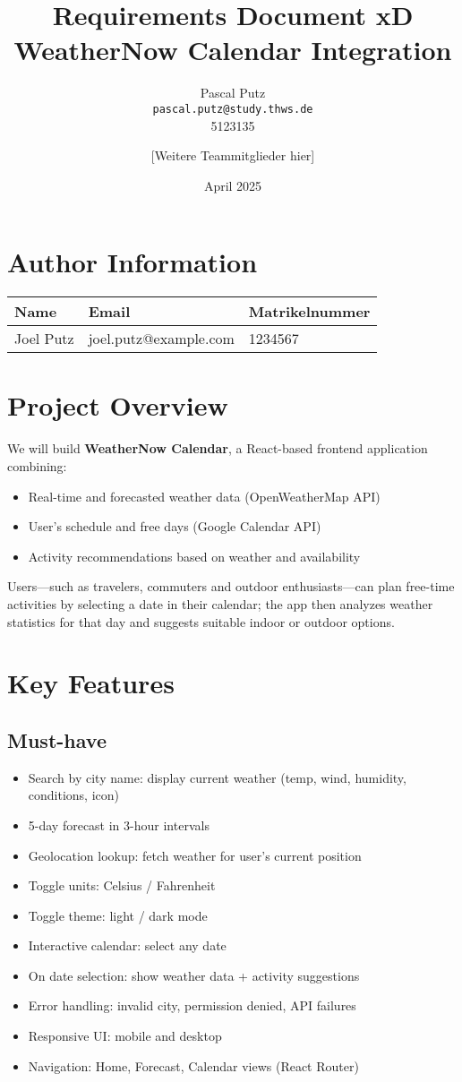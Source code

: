 \documentclass[11pt,a4paper]{article}
\title{Requirements Document xD\\\large WeatherNow Calendar Integration}
\author{
  Pascal Putz \\ \texttt{pascal.putz@study.thws.de} \\ 5123135
  \and
  [Weitere Teammitglieder hier]
}
\date{April 2025}
\begin{document}
\maketitle

\section{Author Information}
\begin{longtable}{|p{5cm}|p{6cm}|p{3cm}|}
\hline
\textbf{Name} & \textbf{Email} & \textbf{Matrikelnummer} \\
\hline
Joel Putz & joel.putz@example.com & 1234567 \\
\hline
\end{longtable}

\section{Project Overview}
We will build \textbf{WeatherNow Calendar}, a React-based frontend application combining:
\begin{itemize}[nosep]
  \item Real-time and forecasted weather data (OpenWeatherMap API)
  \item User’s schedule and free days (Google Calendar API)
  \item Activity recommendations based on weather and availability
\end{itemize}
Users—such as travelers, commuters and outdoor enthusiasts—can plan free-time activities by selecting a date in their calendar; the app then analyzes weather statistics for that day and suggests suitable indoor or outdoor options.

\section{Key Features}
\subsection*{Must-have}
\begin{itemize}[nosep]
  \item Search by city name: display current weather (temp, wind, humidity, conditions, icon)
  \item 5-day forecast in 3-hour intervals
  \item Geolocation lookup: fetch weather for user’s current position
  \item Toggle units: Celsius / Fahrenheit
  \item Toggle theme: light / dark mode
  \item Interactive calendar: select any date
  \item On date selection: show weather data + activity suggestions
  \item Error handling: invalid city, permission denied, API failures
  \item Responsive UI: mobile and desktop
  \item Navigation: Home, Forecast, Calendar views (React Router)
\end{itemize}
\end{document}

